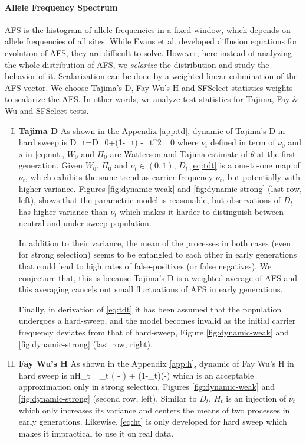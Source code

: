 \documentclass[11pt]{article}
\begin{document}
\paragraph{Allele Frequency Spectrum} AFS is the histogram of allele 
frequencies in a fixed window, which depends on allele frequencies of all sites. 
While Evans et al. \cite{evans2007non} developed diffusion equations for 
evolution of AFS, they are difficult to solve. However, here instead of analyzing 
the whole distribution of AFS, we \emph{sclarize} the distribution and study the 
behavior of it. Scalarization can be done by a weighted linear cobmination of the 
AFS vector. We choose Tajima's D, Fay Wu's H and SFSelect statistics weights to 
scalarize the AFS. In other words, we analyze test statistics for Tajima, Fay \& Wu 
and SFSelect tests.
\begin{enumerate}[I.]
	\item {\bf Tajima D} As shown in the Appendix \ref{app:td}, dynamic of 
	Tajima's D in hard sweep is
	\beq
	D_t=D_0+\log(1-\nu_t)  -\nu_t^2 \Pi_0\label{eq:tdt}
	\eeq
	where $\nu_t$ defined in term of $\nu_0$ and $s$ in \eqref{eq:nut}, $W_0$ 
	and $\Pi_0$ are Watterson and Tajima estimate of $\theta$ at the first 
	generation. Given $W_0$, $\Pi_0$ and $\nu_t \in (0,1)$, $D_t$ 
	\eqref{eq:tdt} is a one-to-one map of $\nu_t$, which exhibits the same 
	trend as carrier frequency $\nu_t$, but potentially with higher variance.
	Figures \ref{fig:dynamic-weak} and \ref{fig:dynamic-strong} (last 
	row, left), shows that the parametric model is reasonable, but observations 
	of $D_t$ has higher variance than $\nu_t$ which makes it harder to 
	distinguish between neutral and under sweep population. 
	
	In addition to their variance, the mean of the processes in both cases 
	(even for strong selection)
	seems to be entangled to each other in early generations  that could lead 
	to high rates of false-positives (or false negatives). We conjecture that, 
	this is because Tajima's D is a weighted average of AFS and this averaging 
	cancels out small fluctuations of AFS in early generations.

	Finally, in derivation of \eqref{eq:tdt} it has been assumed that the 
	population undergoes a hard-sweep, and the model becomes invalid as the 
	initial carrier frequency deviates from that of hard-sweep, Figure 
	\ref{fig:dynamic-weak} and \ref{fig:dynamic-strong} (last 
	row, right).
	
	\item {\bf Fay Wu's H} As shown in the Appendix \ref{app:h}, dynamic of Fay 
	Wu's H in 	hard sweep is
	\beq
	nH_t= \theta \nu_t \left( - \right) +
	\theta (1-\nu_t)\left(-\right) 
	\label{eq:ht}
	\eeq
	which is an acceptable approximation only in strong selection, Figures 
	\ref{fig:dynamic-weak} and \ref{fig:dynamic-strong} (second
	row, left). Similar to $D_t$, $H_t$ is an injection of $\nu_t$ which only 
	increases its variance and centers the means of two processes in early 
	generations. Likewise, \eqref{eq:ht} is only developed for hard sweep which 
	makes it impractical to use it on real data.
	

\end{enumerate}
\end{document}
